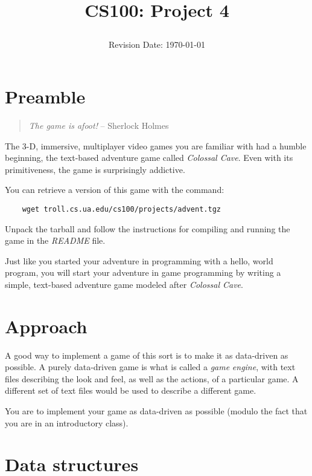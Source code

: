 \documentclass[12pt]{article}
\title{CS100: Project 4\\
\date{Revision Date: \today}}
\begin{document}
\maketitle

\W{}

\section*{Preamble}

\begin{quote}
{\it The game is afoot!}
-- Sherlock Holmes
\end{quote}

The 3-D, immersive, multiplayer video games you are familiar with had
a humble beginning, the text-based adventure game called
{\it Colossal Cave}. Even with its primitiveness, the game is surprisingly
addictive.

You can retrieve a
version of this game with the command:

\begin{verbatim}
    wget troll.cs.ua.edu/cs100/projects/advent.tgz
\end{verbatim}

Unpack the tarball and follow the instructions for compiling
and running the game in the {\it README} file.

Just like you started your adventure in programming with a hello, world
program, you will start your adventure in game programming
by writing a simple, 
text-based adventure game modeled after
{\it Colossal Cave}.

\section*{Approach}

A good way to implement a game of this sort is
to make it as data-driven as possible. A purely data-driven
game is what is called a {\it game} {\it engine},
with text files describing the look and feel, as well as the
actions, of a particular game. A different set of text files
would be used to describe a different game.

You are to implement your game as data-driven as possible
(modulo the fact that you are in an introductory class).

\section{Data structures}
\end{document}
